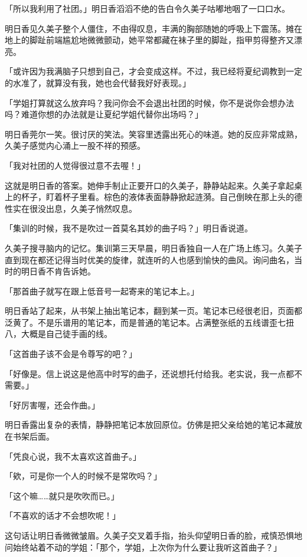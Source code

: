 \documentclass[UTF8]{ctexart}
\begin{document}
    「所以我利用了社团。」明日香滔滔不绝的告白令久美子咕嘟地咽了一口口水。 

    明日香见久美子整个人僵住，不由得叹息，丰满的胸部随她的呼吸上下震荡。摊在地上的脚趾前端尴尬地微微颤动，她平常都藏在袜子里的脚趾，指甲剪得整齐又漂亮。 

    「或许因为我满脑子只想到自己，才会变成这样。不过，我已经将夏纪调教到一定的水准了，就算没有我，她也会代替我好好表现。」 

    「学姐打算就这么放弃吗？我问你会不会退出社团的时候，你不是说你会想办法吗？难道你想的办法就是让夏纪学姐代替你出场吗？」 

    明日香莞尔一笑。很讨厌的笑法。笑容里透露出死心的味道。她的反应非常成熟，久美子感觉内心涌上一股不祥的预感。 

    「我对社团的人觉得很过意不去喔！」 

    这就是明日香的答案。她伸手制止正要开口的久美子，静静站起来。久美子拿起桌上的杯子，盯着杯子里看。棕色的液体表面静静掀起涟漪。自己倒映在那上头的德性实在很没出息，久美子悄然叹息。 

    「集训的时候，我不是吹过一首莫名其妙的曲子吗？」明日香说道。 

    久美子搜寻脑内的记忆。集训第三天早晨，明日香独自一人在广场上练习。久美子直到现在都还记得当时优美的旋律，就连听的人也感到愉快的曲风。询问曲名，当时的明日香不肯告诉她。 

    「那首曲子就写在跟上低音号一起寄来的笔记本上。」 

    明日香站了起来，从书架上抽出笔记本，翻到某一页。笔记本已经很老旧，页面都泛黄了。不是乐谱用的笔记本，而是普通的笔记本。占满整张纸的五线谱歪七扭八，大概是自己徒手画的线。 

    「这首曲子该不会是令尊写的吧？」 

    「好像是。信上说这是他高中时写的曲子，还说想托付给我。老实说，我一点都不需要。」 

    「好厉害喔，还会作曲。」 

    明日香露出复杂的表情，静静把笔记本放回原位。仿佛是把父亲给她的笔记本藏放在书架后面。 

    「凭良心说，我不太喜欢这首曲子。」 

    「欸，可是你一个人的时候不是常吹吗？」 

    「这个嘛……就只是吹吹而已。」 

    「不喜欢的话才不会想吹呢！」 

    这句话让明日香微微皱眉。久美子交叉着手指，抬头仰望明日香的脸，戒慎恐惧地问始终站着不动的学姐：「那个，学姐，上次你为什么要让我听这首曲子？」 
\end{document}
